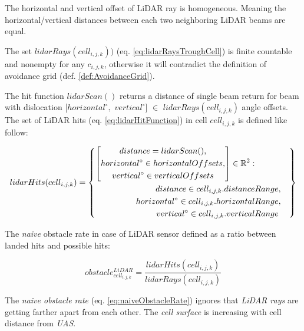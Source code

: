 \noindent The horizontal and vertical offset of LiDAR ray is homogeneous. Meaning the horizontal/vertical distances between each two neighboring LiDAR beams are equal.

The set $lidar Rays(cell_{i,j,k}))$ (eq. \ref{eq:lidarRaysTroughCell}) is finite countable and nonempty for any $c_{i,j,k}$, otherwise it will contradict   the definition of avoidance grid (def. \ref{def:AvoidanceGrid}).

\noindent The hit function $lidarScan()$ returns a distance of single beam return for beam with dislocation $[horizontal^\circ,$ $vertical^\circ]$ $\in$ $lidar Rays(cell_{i,j,k})$ angle offsets. The set of LiDAR hits (eq. \ref{eq:lidarHitFunction}) in cell $cell_{i,j,k}$ is defined like follow:

\begin{equation}\label{eq:lidarHitFunction}
    lidar Hits(cell_{i,j,k})=\left\{
        \begin{aligned}
        \left[
            \begin{gathered}
                distance=lidar Scan(),\\
                horizontal^\circ\in horizontal Offsets,\\
                vertical^\circ\in vertical Offsets
            \end{gathered}
        \right]\in\mathbb{R}^2:&\\
        distance \in cell_{i,j,k}.distance &Range,\\
        horizontal^\circ\in cell_{i,j,k}.horizontal &Range,\\
        vertical^\circ\in cell_{i,j,k}.vertical &Range\\
        \end{aligned}
    \right\}
\end{equation}

\noindent The \emph{naive} obstacle rate in case of LiDAR sensor defined as a ratio between landed hits and possible hits:

\begin{equation}\label{eq:naiveObstacleRate}
    obstacle^{LiDAR}_{cell_{i,j,k}}=\frac{lidar Hits(cell_{i,j,k})}{lidar Rays(cell_{i,j,k})}
\end{equation}

\begin{note}
    The \emph{naive obstacle rate} (eq. \ref{eq:naiveObstacleRate}) ignores that \emph{LiDAR rays} are getting farther apart from each other. The \emph{cell surface} is increasing with cell distance from \emph{UAS}.
\end{note}

